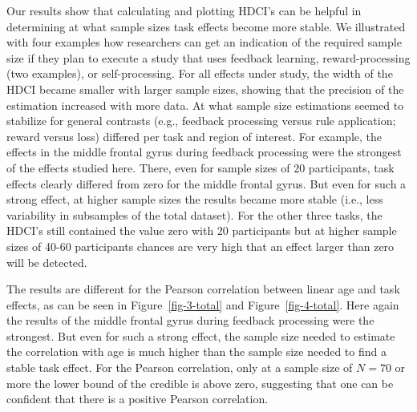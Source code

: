 \documentclass[
  letterpaper,
  DIV=11,
  numbers=noendperiod]{scrartcl}
\begin{document}
Our results show that calculating and plotting HDCI's can be helpful in
determining at what sample sizes task effects become more stable. We
illustrated with four examples how researchers can get an indication of
the required sample size if they plan to execute a study that uses
feedback learning, reward-processing (two examples), or self-processing.
For all effects under study, the width of the HDCI became smaller with
larger sample sizes, showing that the precision of the estimation
increased with more data. At what sample size estimations seemed to
stabilize for general contrasts (e.g., feedback processing versus rule
application; reward versus loss) differed per task and region of
interest. For example, the effects in the middle frontal gyrus during
feedback processing were the strongest of the effects studied here.
There, even for sample sizes of 20 participants, task effects clearly
differed from zero for the middle frontal gyrus. But even for such a
strong effect, at higher sample sizes the results became more stable
(i.e., less variability in subsamples of the total dataset). For the
other three tasks, the HDCI's still contained the value zero with 20
participants but at higher sample sizes of 40-60 participants chances
are very high that an effect larger than zero will be detected.

The results are different for the Pearson correlation between linear age
and task effects, as can be seen in Figure~\ref{fig-3-total} and
Figure~\ref{fig-4-total}. Here again the results of the middle frontal
gyrus during feedback processing were the strongest. But even for such a
strong effect, the sample size needed to estimate the correlation with
age is much higher than the sample size needed to find a stable task
effect. For the Pearson correlation, only at a sample size of \(N=70\)
or more the lower bound of the credible is above zero, suggesting that
one can be confident that there is a positive Pearson correlation.
\end{document}

